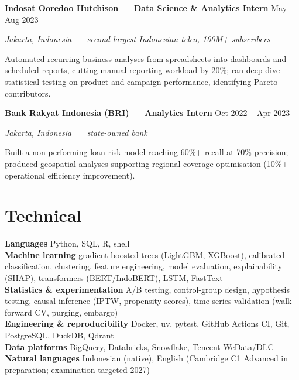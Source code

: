 \documentclass[11pt,a4paper]{article}
\newcommand{\heading}[2]{\textbf{#1} \hfill {\small\color{muted}#2}\par}
\newcommand{\subheading}[1]{\textit{\small #1}\par}
\begin{document}
\heading{Indosat Ooredoo Hutchison --- Data Science \& Analytics Intern}{May -- Aug 2023}
\subheading{Jakarta, Indonesia \ \textbullet\ \ second-largest Indonesian telco, 100M+ subscribers}

Automated recurring business analyses from spreadsheets into dashboards and scheduled
reports, cutting manual reporting workload by 20\%; ran deep-dive statistical testing on
product and campaign performance, identifying Pareto contributors.

\heading{Bank Rakyat Indonesia (BRI) --- Analytics Intern}{Oct 2022 -- Apr 2023}
\subheading{Jakarta, Indonesia \ \textbullet\ \ state-owned bank}

Built a non-performing-loan risk model reaching 60\%+ recall at 70\% precision; produced
geospatial analyses supporting regional coverage optimisation (10\%+ operational efficiency
improvement).

\section{Technical}

\textbf{Languages} Python, SQL, R, shell \\
\textbf{Machine learning} gradient-boosted trees (LightGBM, XGBoost), calibrated
classification, clustering, feature engineering, model evaluation, explainability (SHAP),
transformers (BERT/IndoBERT), LSTM, FastText \\
\textbf{Statistics \& experimentation} A/B testing, control-group design, hypothesis
testing, causal inference (IPTW, propensity scores), time-series validation (walk-forward
CV, purging, embargo) \\
\textbf{Engineering \& reproducibility} Docker, uv, pytest, GitHub Actions CI, Git,
PostgreSQL, DuckDB, Qdrant \\
\textbf{Data platforms} BigQuery, Databricks, Snowflake, Tencent WeData/DLC \\
\textbf{Natural languages} Indonesian (native), English (Cambridge C1 Advanced in
preparation; examination targeted 2027)
\end{document}
